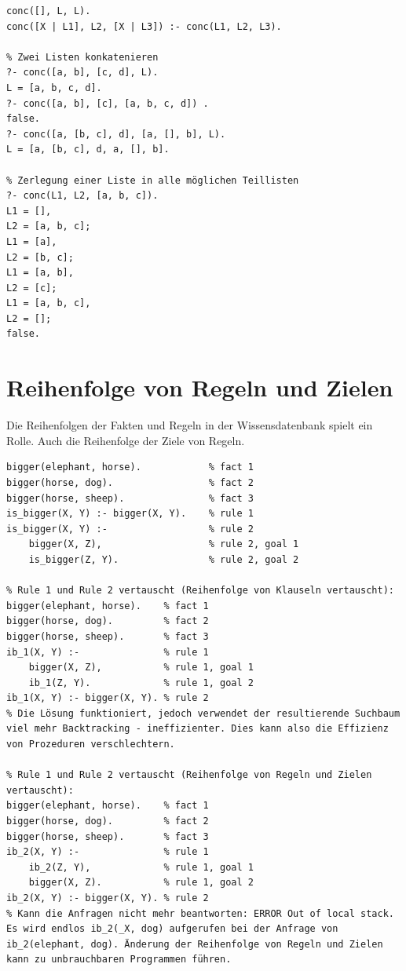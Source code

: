 \begin{lstlisting}[caption=Listenkonkatenation]
conc([], L, L).
conc([X | L1], L2, [X | L3]) :- conc(L1, L2, L3).

% Zwei Listen konkatenieren
?- conc([a, b], [c, d], L).
L = [a, b, c, d].
?- conc([a, b], [c], [a, b, c, d]) .
false.
?- conc([a, [b, c], d], [a, [], b], L).
L = [a, [b, c], d, a, [], b].

% Zerlegung einer Liste in alle möglichen Teillisten
?- conc(L1, L2, [a, b, c]).
L1 = [],
L2 = [a, b, c];
L1 = [a],
L2 = [b, c];
L1 = [a, b],
L2 = [c];
L1 = [a, b, c],
L2 = [];
false.
\end{lstlisting}

\newpage
\section{Reihenfolge von Regeln und Zielen}
Die Reihenfolgen der Fakten und Regeln in der Wissensdatenbank spielt ein Rolle. Auch die Reihenfolge der Ziele von Regeln.

\begin{lstlisting}[caption=Reihenfolgen von Regeln und Zielen]
% Bekanntes is_bigger/2 Prädikat:
bigger(elephant, horse). 			% fact 1
bigger(horse, dog). 				% fact 2
bigger(horse, sheep). 				% fact 3
is_bigger(X, Y) :- bigger(X, Y). 	% rule 1
is_bigger(X, Y) :- 					% rule 2
	bigger(X, Z), 					% rule 2, goal 1
	is_bigger(Z, Y). 				% rule 2, goal 2

% Rule 1 und Rule 2 vertauscht (Reihenfolge von Klauseln vertauscht):
bigger(elephant, horse). 	% fact 1
bigger(horse, dog). 		% fact 2
bigger(horse, sheep). 		% fact 3
ib_1(X, Y) :- 				% rule 1
	bigger(X, Z), 			% rule 1, goal 1
	ib_1(Z, Y). 			% rule 1, goal 2
ib_1(X, Y) :- bigger(X, Y). % rule 2
% Die Lösung funktioniert, jedoch verwendet der resultierende Suchbaum viel mehr Backtracking - ineffizienter. Dies kann also die Effizienz von Prozeduren verschlechtern.

% Rule 1 und Rule 2 vertauscht (Reihenfolge von Regeln und Zielen vertauscht):
bigger(elephant, horse). 	% fact 1
bigger(horse, dog). 		% fact 2
bigger(horse, sheep). 		% fact 3
ib_2(X, Y) :- 				% rule 1
	ib_2(Z, Y), 			% rule 1, goal 1
	bigger(X, Z). 			% rule 1, goal 2
ib_2(X, Y) :- bigger(X, Y). % rule 2
% Kann die Anfragen nicht mehr beantworten: ERROR Out of local stack. Es wird endlos ib_2(_X, dog) aufgerufen bei der Anfrage von ib_2(elephant, dog). Änderung der Reihenfolge von Regeln und Zielen kann zu unbrauchbaren Programmen führen.
\end{lstlisting}

